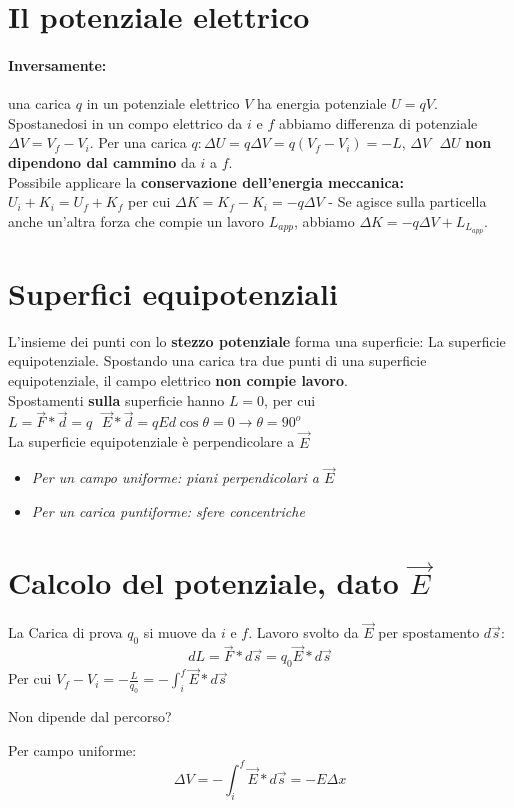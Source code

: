 \documentclass{book}
\begin{document}
\section{Il potenziale elettrico}
\paragraph{Inversamente:} una carica $q$ in un potenziale elettrico $V$ ha energia potenziale $U=qV$. Spostanedosi in un compo elettrico da $i$ e $f$ abbiamo differenza di potenziale $\Delta V=V_f-V_i$. Per una carica $q: \Delta U=q\Delta V=q(V_f-V_i)=-L$, $\Delta V \text{ } \Delta U$ \textbf{non dipendono dal cammino} da $i$ a $f$.\\
Possibile applicare la \textbf{conservazione dell'energia meccanica: } $U_i+K_i=U_f+K_f$ per cui $\Delta K=K_f-K_i=-q\Delta V$ - Se agisce sulla particella anche un'altra forza che compie un lavoro $L_{app}$, abbiamo $\Delta K=-q\Delta V+L_{L_{app}}$.
\section{Superfici equipotenziali}
L'insieme dei punti con lo \textbf{stezzo potenziale} forma una superficie: La superficie equipotenziale. Spostando una carica tra due punti di una superficie equipotenziale, il campo elettrico \textbf{non compie lavoro}.\\
Spostamenti \textbf{sulla} superficie hanno $L=0$, per cui $L=\vec{F}*\vec{d}=q \text{ } \vec{E}*\vec{d}=qEd\cos\theta=0\to \theta =90^o$\\
La superficie equipotenziale è perpendicolare a $\vec{E}$
\begin{itemize}
\item \textit{Per un campo uniforme: piani perpendicolari a $\vec{E}$}
\item \textit{Per un carica puntiforme: sfere concentriche}
\end{itemize}
\section {Calcolo del potenziale, dato $\vec{E}$}
La Carica di prova $q_0$ si muove da $i$ e $f$. Lavoro svolto da $\vec{E}$ per spostamento $d\vec{s}$:
\begin{equation}
	dL=\vec{F}*d\vec{s}=q_0\vec{E}*d\vec{s}
\end{equation}
Per cui $V_f-V_i=-\frac{L}{q_0}=-\int^f_i \vec{E}*d\vec{s}$
\begin{center}
	Non dipende dal percorso?
\end{center}
Per campo uniforme:
\begin{equation}
  \Delta V=-\int_i^f \vec{E}*d\vec{s}=-E\Delta x
\end{equation}
\end{document}

